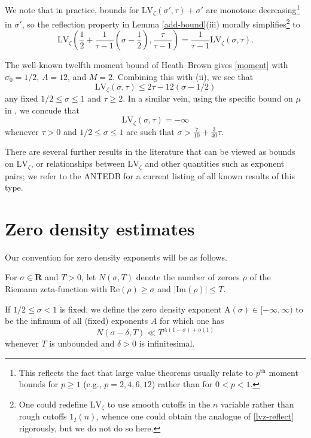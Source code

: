 \documentclass[a4paper, 10pt]{amsart}
\newcommand{\R}{\mathbf{R}}
\newcommand{\LV}{\mathrm{LV}}
\newcommand{\A}{\mathrm{A}}
\begin{document}
\begin{remark}
    We note that in practice, bounds for $\LV_\zeta(\sigma',\tau)+\sigma'$ are monotone decreasing\footnote{This reflects the fact that large value theorems usually relate to $p^{\mathrm{th}}$ moment bounds for $p \geq 1$ (e.g., $p = 2, 4, 6, 12$) rather than for $0 < p < 1$.} in $\sigma'$, so the reflection property in Lemma \ref{add-bound}(iii) morally simplifies\footnote{One could redefine $\LV_\zeta$ to use smooth cutoffs in the $n$ variable rather than rough cutoffs $1_I(n)$, whence one could obtain the analogue of \eqref{lvz-reflect} rigorously, but we do not do so here.} to
\begin{equation}\label{lvz-reflect}
    \LV_\zeta\left(\frac{1}{2} + \frac{1}{\tau-1} \left(\sigma-\frac{1}{2}\right), \frac{\tau}{\tau-1}\right) = \frac{1}{\tau-1} \LV_\zeta(\sigma,\tau).
\end{equation}
\end{remark}

The well-known twelfth moment bound of Heath--Brown \cite{heathbrown_twelfth_1978} gives \eqref{moment} with $\sigma_0=1/2$, $A=12$, and $M=2$.  Combining this with (ii), we see that
\begin{equation}\label{twelfth-bound} \LV_\zeta(\sigma,\tau) \leq 2\tau - 12 (\sigma-1/2)
\end{equation}
any fixed $1/2 \leq \sigma \leq 1$ and $\tau \geq 2$. In a similar vein, using the specific bound on $\mu$ in , we concude that
\begin{equation}\label{lvz-340}
    \LV_\zeta(\sigma,\tau) = -\infty
\end{equation}
whenever $\tau>0$ and $1/2 \leq \sigma \leq 1$ are such that $\sigma > \frac{7}{10} + \frac{3}{40} \tau$.

There are several further results in the literature that can be viewed as bounds on $\LV_\zeta$, or relationships between $\LV_\zeta$ and other quantities such as exponent pairs; we refer  to the ANTEDB for a current listing of all known results of this type.

\section{Zero density estimates}

Our convention for zero density exponents will be as follows.

\begin{definition}\label{zero-def}  For $\sigma \in \R$ and $T>0$, let $N(\sigma,T)$ denote the number of zeroes $\rho$ of the Riemann zeta-function with $\mathrm{Re}(\rho) \geq \sigma$ and $|\mathrm{Im}(\rho)| \leq T$.

    If $1/2 \leq \sigma < 1$ is fixed, we define the zero density exponent $\A(\sigma) \in [-\infty,\infty)$ to be the infimum of all (fixed) exponents $A$ for which one has
        $$ N(\sigma-\delta,T) \ll T^{A (1-\sigma)+o(1)}$$
    whenever $T$ is unbounded and $\delta>0$ is infinitesimal.
\end{definition}
\end{document}

